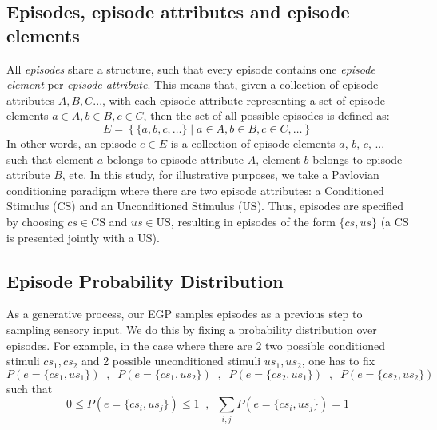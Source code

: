 \documentclass{article}
\begin{document}
\subsection*{Episodes, episode attributes and episode elements}
All \textit{episodes} share a structure, such that every episode contains one \textit{episode element} per \textit{episode attribute}. This means that, given a collection of episode attributes $A, B, C...$, with each episode attribute representing a set of episode elements $a\in A, b\in B, c\in C$, then the set of all possible episodes is defined as:
\begin{equation}
    E = \left\{ \{a, b, c, \dots\} \mid a \in A, b \in B, c \in C, \dots \right\}
\end{equation}
In other words, an episode $e\in E$ is a collection of episode elements $a$, $b$, $c$, ... such that element $a$ belongs to episode attribute  $A$, element $b$ belongs to episode attribute $B$, etc.
\newline\newline
In this study, for illustrative purposes, we take a Pavlovian conditioning paradigm where there are two episode attributes: a Conditioned Stimulus (CS) and an Unconditioned Stimulus (US). Thus, episodes are specified by choosing $cs \in \textrm{CS}$ and $us \in \textrm{US}$, resulting in episodes of the form $\{cs, us\}$ (a CS is presented jointly with a US).
\subsection*{Episode Probability Distribution}
As a generative process, our EGP samples episodes as a previous step to sampling sensory input. We do this by fixing a probability distribution over episodes. For example, in the case where there are 2 two possible conditioned stimuli $cs_1, cs_2$ and 2 possible unconditioned stimuli $us_1, us_2$, one has to fix
\begin{equation}
    P(e = \{cs_1, us_1\}) \;\;, \;\; P(e = \{cs_1, us_2\}) \;\;, \;\; P(e = \{cs_2, us_1\})\;\;, \;\; P(e = \{cs_2, us_2\})
\end{equation}
such that
\begin{equation}
    0 \leq P(e = \{cs_i, us_j\}) \leq 1  \;\;,\;\; \sum_{i, j}P(e = \{cs_i, us_j\}) = 1 
\end{equation}
\end{document}
